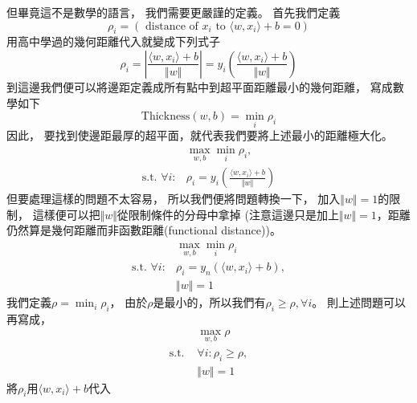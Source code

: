   但畢竟這不是數學的語言，
  我們需要更嚴謹的定義。
  首先我們定義
  \begin{equation}
    \rho_i = \left( \text{ distance of } x_i \text{ to } \langle w, x_i \rangle + b = 0 \right)
  \end{equation}
  用高中學過的幾何距離代入就變成下列式子
  \begin{equation}
    \rho_i = \left\vert \frac{ \langle w, x_i \rangle + b }{ \Vert w \Vert } \right\vert 
    = y_i \left( \frac{ \langle w, x_i \rangle + b }{ \Vert w \Vert } \right)
  \end{equation}    
  到這邊我們便可以將邊距定義成所有點中到超平面距離最小的幾何距離，
  寫成數學如下
  \begin{equation}
  \text{Thickness}(w, b) = \min_i \rho_i
  \end{equation}
  因此，
  要找到使邊距最厚的超平面，就代表我們要將上述最小的距離極大化。
  \begin{equation}
    \begin{split}
    &\max_{w, b} \min_i \rho_i, \\
    \text{s.t. } \forall i: &\rho_i = y_i \left( \frac{ \langle w, x_i \rangle + b }{ \Vert w \Vert } \right)
    \end{split}
  \end{equation}  
  但要處理這樣的問題不太容易，
  所以我們便將問題轉換一下，
  加入$\Vert w \Vert = 1$的限制，
  這樣便可以把$\Vert w \Vert$從限制條件的分母中拿掉
  (注意這邊只是加上$\Vert w \Vert = 1$，距離仍然算是幾何距離而非函數距離(functional distance))。
  \begin{equation}
    \begin{split}
      &\max_{w, b} \min_i \rho_i \\
      \text{s.t. } \forall i:  &\rho_i = y_n ( \langle w, x_i \rangle + b ), \\
      &\Vert w \Vert = 1
    \end{split}
  \end{equation}    
  我們定義$\rho = \min_i \rho_i$，
  由於$\rho$是最小的，所以我們有$\rho_i \geq \rho, \forall i$。
  則上述問題可以再寫成，
  \begin{equation}
    \begin{split}
      &\max_{w, b} \rho \\
      \text{s.t. } &\forall i: \rho_i \geq \rho, \\
      &\Vert w \Vert = 1
    \end{split}
  \end{equation}
  將$\rho_i$用$\langle w, x_i \rangle + b$代入
